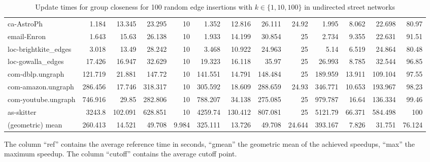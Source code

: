 \begin{landscape}
\begin{table}[h!]
\begin{tabular}{l|rrrr|rrrr|rrrr}
 ca-AstroPh           &    1.184 &  13.345 &  23.295 &   10     &    1.352 &  12.816 &  26.111 &   24.92  &    1.995 &   8.062 &  22.698 &   80.97  \\
 email-Enron          &    1.643 &  15.63  &  26.138 &   10     &    1.933 &  14.199 &  30.854 &   25     &    2.734 &   9.355 &  22.631 &   91.51  \\
 loc-brightkite\_edges &    3.018 &  13.49  &  28.242 &   10     &    3.468 &  10.922 &  24.963 &   25     &    5.14  &   6.519 &  24.864 &   80.48  \\
 loc-gowalla\_edges    &   17.426 &  16.947 &  32.629 &   10     &   19.323 &  16.118 &  35.97  &   25     &   26.993 &   8.785 &  32.544 &   96.85  \\
 com-dblp.ungraph     &  121.719 &  21.881 & 147.72  &   10     &  141.551 &  14.791 & 148.484 &   25     &  189.959 &  13.911 & 109.104 &   97.55  \\
 com-amazon.ungraph   &  286.456 &  17.746 & 318.317 &   10     &  305.592 &  18.609 & 288.659 &   24.93  &  346.771 &  10.653 & 193.967 &   98.23  \\
 com-youtube.ungraph  &  746.916 &  29.85  & 282.806 &   10     &  788.207 &  34.138 & 275.085 &   25     &  979.787 &  16.64  & 136.334 &   99.46  \\
 as-skitter           & 3243.8   & 102.091 & 628.851 &   10     & 4259.74  & 130.412 & 807.081 &   25     & 5121.79  &  66.371 & 584.498 &  100     \\ \midrule \midrule
 (geometric) mean     &  260.413 &  14.521 &  49.708 &    9.984 &  325.111 &  13.726 &  49.708 &   24.644 &  393.167 &   7.826 &  31.751 &   76.124 \\
\bottomrule
\end{tabular}
\caption{Update times for group closeness for 100 random edge insertions with  $k \in \{1, 10, 100\}$ in undirected street networks}{The column ``ref'' contains the average reference time in seconds, ``gmean'' the geometric mean of the achieved speedups, ``max'' the maximum speedup. The column ``cutoff'' contains the average cutoff point.}
\label{tbl:groupClosenessResults}
\end{table}	
\end{landscape}


